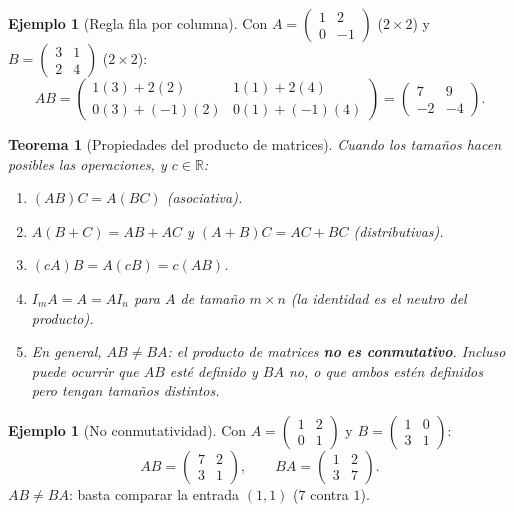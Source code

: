 \documentclass[11pt,letterpaper]{article}
\theoremstyle{definition}
\newtheorem{ejemplo}[definicion]{Ejemplo}
\theoremstyle{plain}
\newtheorem{teorema}[definicion]{Teorema}
\newcommand{\R}{\mathbb{R}}
\begin{document}
\begin{ejemplo}[Regla fila por columna]
Con $A=\begin{pmatrix}1&2\\0&-1\end{pmatrix}$ ($2\times 2$) y
$B=\begin{pmatrix}3&1\\2&4\end{pmatrix}$ ($2\times 2$):
\[
  AB = \begin{pmatrix}
    1(3)+2(2) & 1(1)+2(4) \\
    0(3)+(-1)(2) & 0(1)+(-1)(4)
  \end{pmatrix} = \begin{pmatrix}7&9\\-2&-4\end{pmatrix}.
\]
\end{ejemplo}

\begin{teorema}[Propiedades del producto de matrices]
Cuando los tamaños hacen posibles las operaciones, y $c\in\R$:
\begin{enumerate}[label=(\roman*)]
  \item $(AB)C = A(BC)$ (asociativa).
  \item $A(B+C) = AB+AC$ y $(A+B)C = AC+BC$ (distributivas).
  \item $(cA)B = A(cB) = c(AB)$.
  \item $I_mA = A = AI_n$ para $A$ de tamaño $m\times n$ (la identidad es el neutro del producto).
  \item En general, \textbf{$AB\neq BA$}: el producto de matrices \textbf{no es conmutativo}.
        Incluso puede ocurrir que $AB$ esté definido y $BA$ no, o que ambos estén definidos pero
        tengan tamaños distintos.
\end{enumerate}
\end{teorema}

\begin{ejemplo}[No conmutatividad]
Con $A=\begin{pmatrix}1&2\\0&1\end{pmatrix}$ y $B=\begin{pmatrix}1&0\\3&1\end{pmatrix}$:
\[
  AB = \begin{pmatrix}7&2\\3&1\end{pmatrix}, \qquad
  BA = \begin{pmatrix}1&2\\3&7\end{pmatrix}.
\]
$AB\neq BA$: basta comparar la entrada $(1,1)$ ($7$ contra $1$).
\end{ejemplo}
\end{document}
